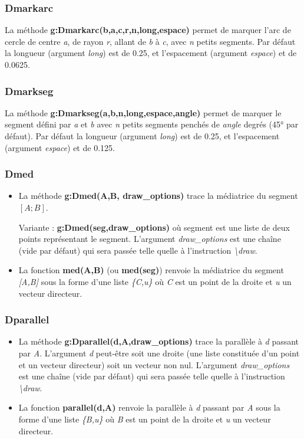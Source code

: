 \documentclass[%
10pt,%
a4paper,%
french,%
]%
{article}%
\begin{document}
\subsubsection{Dmarkarc}
La méthode \textbf{g:Dmarkarc(b,a,c,r,n,long,espace)} permet de marquer l'arc de cercle de centre \emph{a}, de rayon \emph{r}, allant de \emph{b} à \emph{c}, avec \emph{n} petits segments. Par défaut la longueur (argument \emph{long}) est de 0.25, et l'espacement (argument \emph{espace}) et de 0.0625.

\subsubsection{Dmarkseg}
La méthode \textbf{g:Dmarkseg(a,b,n,long,espace,angle)} permet de marquer le segment défini par \emph{a} et \emph{b} avec \emph{n} petits segments penchés de \emph{angle} degrés (45° par défaut). Par défaut la longueur (argument \emph{long}) est de 0.25, et l'espacement (argument \emph{espace}) et de 0.125.

\subsubsection{Dmed}
\begin{itemize}
    \item La méthode \textbf{g:Dmed(A,B, draw\_options)} trace la médiatrice du segment $[A;B]$.

  Variante : \textbf{g:Dmed(seg,draw\_options)} où segment est une liste de deux points représentant le segment. L'argument \emph{draw\_options} est une chaîne (vide par défaut) qui sera passée telle quelle à l'instruction \emph{\textbackslash draw}.
  \item La fonction \textbf{med(A,B)} (ou \textbf{med(seg)}) renvoie la médiatrice du segment \emph{{[}A,B{]}} sous la forme d'une liste \emph{\{C,u\}} où \emph{C} est un point de la droite et \emph{u} un vecteur directeur.
\end{itemize}

\subsubsection{Dparallel}
\begin{itemize}
    \item La méthode \textbf{g:Dparallel(d,A,draw\_options)} trace la parallèle à \emph{d} passant par \emph{A}. L'argument \emph{d} peut-être soit une droite (une liste constituée d'un point et un vecteur directeur) soit un vecteur non nul. L'argument \emph{draw\_options} est une chaîne (vide par défaut) qui sera passée telle quelle à l'instruction \emph{\textbackslash draw}.
    \item La fonction \textbf{parallel(d,A)} renvoie la parallèle à \emph{d} passant par \emph{A} sous la forme d'une liste \emph{\{B,u\}} où \emph{B} est un point de la droite et \emph{u} un vecteur directeur.
\end{itemize}
\end{document}
